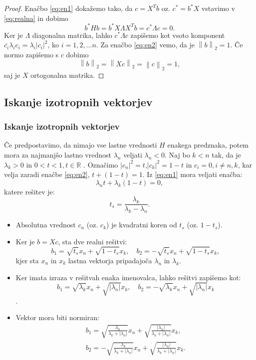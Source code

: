 \documentclass{beamer}
\newcommand{\abs}[1]{ \left\lvert#1\right\rvert}
\newcommand{\norm}[1]{\left\lVert#1\right\rVert}
\newcommand{\R}{\mathbb R}
\begin{document}
\begin{frame}
\begin{proof}
Enačbo \eqref{eq:en1}  dokažemo tako, da $c=X^Tb$ oz. $c^\ast =b^\ast X$ vstavimo v \eqref{eq:realna} in dobimo $$b^\ast Hb=b^\ast X\Lambda X^T b= c^\ast \Lambda c=0.$$ Ker je $\Lambda$ diagonalna matrika, lahko $c^\ast \Lambda c$ zapišemo kot vsoto komponent $\bar{c_i}\lambda_i c_i=\lambda_i\abs{c_i}^2$, ko $i=1,2,...n$.
Za enačbo \eqref{eq:en2} vemo, da je $\norm{b}_2=1$. Če normo zapišemo s $c$ dobimo $$\norm{b}_2=\norm{Xc}_2=\norm{c}_2=1,$$ saj je $X$ ortogonalna matrika.
\end{proof}
\end{frame}
\subsection{Iskanje izotropnih vektorjev}
\begin{frame}
\frametitle{Iskanje izotropnih vektorjev}
\begin{block}{}
Če predpostavimo, da nimajo vse lastne vrednosti $H$ enakega predznaka, potem mora za najmanjšo lastno vrednost $\lambda_n$ veljati $\lambda_n <0$. 
 Naj bo $k<n$ tak, da je $\lambda_k >0$ in $0<t<1, t\in \R$ .  Označimo $\abs{c_n}^2 =t$,$\abs{c_k}^2=1-t$ in $c_i=0, i\not=n,k$, kar velja zaradi enačbe \eqref{eq:en2}, $t+ (1-t)=1$. Iz \eqref{eq:en1} mora veljati enačba: $$\lambda_n t +\lambda_k (1-t)=0,$$ katere rešitev je:
\begin{equation}
t_s=\frac{\lambda_k}{\lambda_k -\lambda_n}.
\end{equation}
\end{block}
\end{frame}
\begin{frame}
\begin{itemize}
\item Absolutna vrednost $c_n$ (oz. $c_k$) je kvadratni koren od $t_s$ (oz. $1-t_s$).
\item Ker je $b=Xc$, sta dve realni rešitvi: $$b_1=\sqrt{t_s}x_n +\sqrt{1-t_s}x_k,\quad b_2=-\sqrt{t_s}x_n+\sqrt{1-t_s}x_k,$$ kjer sta $x_n$ in $x_k$ lastna vektorja pripadajoča  $\lambda_n$ in $\lambda_k$.\pause
\item Ker imata izraza v rešitvah enaka imenovalca, lahko rešitvi zapišemo kot: $$b_1=\sqrt{\lambda_k}x_n+\sqrt{\abs{\lambda_n}}x_k, \quad b_2=-\sqrt{\lambda_k}x_n+\sqrt{\abs{\lambda_n}}x_k$$.\pause
\item Vektor mora biti normiran:
\begin{align*}
b_1=\sqrt{\frac{\lambda_k}{\lambda_k +\abs{\lambda_n}}}x_n + \sqrt{\frac{\abs{\lambda_n}}{\lambda_k +\abs{\lambda_n}}}x_k,\\ b_2=-\sqrt{\frac{\lambda_k}{\lambda_k +\abs{\lambda_n}}}x_n + \sqrt{\frac{\abs{\lambda_n}}{\lambda_k +\abs{\lambda_n}}}x_k.
\end{align*}
\end{itemize}
\end{frame}
\end{document}
